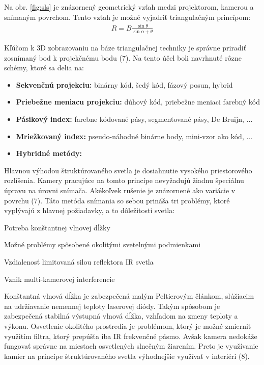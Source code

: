 Na obr. \ref{fig:sls} je znázornený geometrický vzťah medzi projektorom, kamerou a snímaným povrchom. Tento vzťah je možné vyjadriť triangulačným princípom:
\begin{equation}
\label{eq1}
\begin{aligned}
R=B\frac{\sin\theta}{\sin\alpha + \theta}
\end{aligned}
\end{equation}

Kľúčom k 3D zobrazovaniu na báze triangulačnej techniky je správne priradiť zosnímaný bod
k projekčnému bodu (7). Na tento účel boli navrhnuté rôzne schémy, ktoré sa delia na:

\begin{itemize}
	\item \textbf{Sekvenčnú projekciu:} binárny kód, šedý kód, fázový posun, hybrid 
	\item \textbf{Priebežne meniacu projekciu:} dúhový kód, priebežne meniaci farebný kód 
	\item \textbf{Pásikový index:} farebne kódované pásy, segmentované pásy, De Bruijn, ...
	\item \textbf{Mriežkovaný index:} pseudo-náhodné binárne body, mini-vzor ako kód, ...
	\item \textbf{Hybridné metódy:} 
\end{itemize}

Hlavnou výhodou štruktúrovaného svetla je dosiahnutie vysokého priestorového rozlíšenia. Kamery pracujúce na tomto princípe nevyžadujú žiadnu špeciálnu úpravu na úrovni snímača. Akékoľvek rušenie je znázornené ako variácie v povrchu (7). Táto metóda snímania so sebou prináša tri problémy, ktoré vyplývajú z hlavnej požiadavky, a to dôležitosti svetla:


\begin{compactitem}
	\item Potreba konštantnej vlnovej dĺžky 
	\item Možné problémy spôsobené okolitými svetelnými podmienkami 
	\item Vzdialenosť limitovaná silou reflektora IR svetla
	\item Vznik multi-kamerovej interferencie
\end{compactitem} 
\vline

Konštantná vlnová dĺžka je zabezpečená malým Peltierovým článkom, slúžiacim na udržiavanie nemennej teploty laserovej diódy. Takým spôsobom je zabezpečená stabilná výstupná vlnová dĺžka, vzhľadom na zmeny teploty a výkonu. Osvetlenie okolitého prostredia je problémom, ktorý je možné zmierniť využitím filtra, ktorý prepúšťa iba IR frekvenčné pásmo. Avšak kamera nedokáže fungovať správne na miestach osvetlených slnečným žiarením. Preto je využívanie kamier na princípe štruktúrovaného svetla výhodnejšie využívať v interiéri (8).

